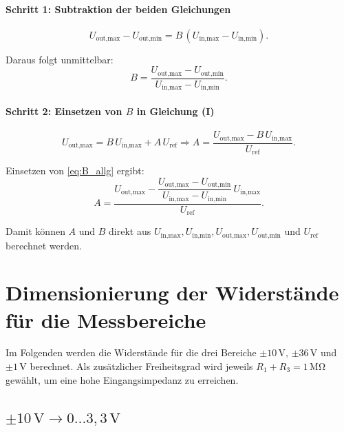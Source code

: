 \documentclass{article}
\begin{document}
	\paragraph{Schritt 1: Subtraktion der beiden Gleichungen}
	
	\[
	U_{\text{out,max}}-U_{\text{out,min}}
	= B\,(U_{\text{in,max}}-U_{\text{in,min}}).
	\]
	
	Daraus folgt unmittelbar:
	\begin{equation}
		B=
		\frac{U_{\text{out,max}}-U_{\text{out,min}}}
		{U_{\text{in,max}}-U_{\text{in,min}}}.
		\label{eq:B_allg}
	\end{equation}
	
	\paragraph{Schritt 2: Einsetzen von \(B\) in Gleichung (I)}
	
	\[
	U_{\text{out,max}}=B\,U_{\text{in,max}}+A\,U_{\text{ref}} \Rightarrow
	A=\frac{U_{\text{out,max}}-B\,U_{\text{in,max}}}{U_{\text{ref}}}.
	\]
	
	Einsetzen von \eqref{eq:B_allg} ergibt:
	\begin{equation}
		A=
		\frac{U_{\text{out,max}}
			-\dfrac{U_{\text{out,max}}-U_{\text{out,min}}}
			{U_{\text{in,max}}-U_{\text{in,min}}}\,U_{\text{in,max}}}
		{U_{\text{ref}}}.
		\label{eq:A_allg}
	\end{equation}
	
	Damit können \(A\) und \(B\) direkt aus
	\(U_{\text{in,max}}, U_{\text{in,min}}, U_{\text{out,max}},
	U_{\text{out,min}}\) und \(U_{\text{ref}}\) berechnet werden.
	
	\newpage
	
	\section{Dimensionierung der Widerstände für die Messbereiche}
	
	Im Folgenden werden die Widerstände für die drei Bereiche
	\(\pm 10\,\mathrm{V}\), \(\pm 36\,\mathrm{V}\) und \(\pm 1\,\mathrm{V}\) berechnet.  
	Als zusätzlicher Freiheitsgrad wird jeweils \(R_1 + R_3 = 1\,\mathrm{M\Omega}\) gewählt, um eine hohe Eingangsimpedanz zu erreichen.
	
	\subsection{\(\pm 10\,\text{V}\rightarrow 0\dots3{,}3\,\text{V}\)}
	
\end{document}
